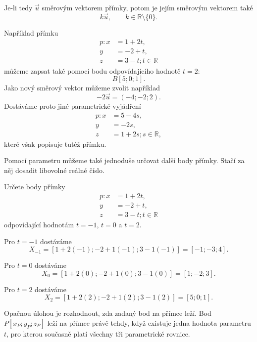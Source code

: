 Je-li tedy $\vec{u}$ směrovým vektorem přímky, potom je jejím směrovým
vektorem také
\[
    k\vec{u},
    \qquad
    k\in\mathbb{R}\setminus\{0\}.
\]

Například přímku
\[
    \begin{aligned}
        p: x&=1+2t,\\
        y&=-2+t,\\
        z&=3-t; t\in\mathbb{R}
    \end{aligned}
\]
můžeme zapsat také pomocí bodu odpovídajícího hodnotě $t=2$:
\[
    B[5;0;1].
\]
Jako nový směrový vektor můžeme zvolit například
\[
    -2\vec{u}=(-4;-2;2).
\]
Dostáváme proto jiné parametrické vyjádření
\[
    \begin{aligned}
        p: x&=5-4s,\\
        y&=-2s,\\
        z&=1+2s; s\in\mathbb{R},
    \end{aligned}
\]
které však popisuje tutéž přímku.

Pomocí parametru můžeme také jednoduše určovat další body přímky. Stačí
za něj dosadit libovolné reálné číslo.

\begin{example}
    \label{exa:Points_on_parametric_line_space}
    Určete body přímky
    \[
        \begin{aligned}
            p: x&=1+2t,\\
            y&=-2+t,\\
            z&=3-t; t\in\mathbb{R}
        \end{aligned}
    \]
    odpovídající hodnotám $t=-1$, $t=0$ a $t=2$.

    Pro $t=-1$ dostáváme
    \[
        X_{-1}
        =
        [1+2(-1);-2+1(-1);3-1(-1)]
        =
        [-1;-3;4].
    \]

    Pro $t=0$ dostáváme
    \[
        X_0 
        = 
        [1+2(0);-2+1(0);3-1(0)] 
        =
        [1;-2;3].
    \]

    Pro $t=2$ dostáváme
    \[
        X_2
        =
        [1+2(2);-2+1(2);3-1(2)]
        =
        [5;0;1].
    \]
\end{example}

Opačnou úlohou je rozhodnout, zda zadaný bod na přímce leží. Bod
$P[x_P;y_P;z_P]$ leží na přímce právě tehdy, když existuje jedna hodnota
parametru $t$, pro kterou současně platí všechny tři parametrické rovnice.

